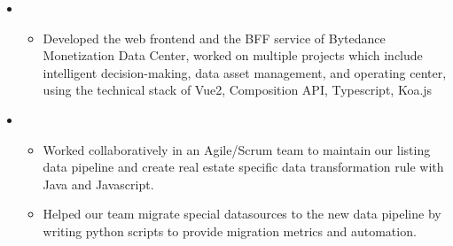 \documentclass[11pt,a4paper,sans]{moderncv}        %
\begin{document}
\begin{itemize}
\vspace{2pt}

\item{

\begin{itemize}
\item{Developed the web frontend and the BFF service of Bytedance Monetization Data Center, worked on multiple projects which include intelligent decision-making, data asset management, and operating center, using the technical stack of Vue2, Composition API, Typescript, Koa.js}

\end{itemize}}

\vspace{1em}

\item{

\begin{itemize}
\item{Worked collaboratively in an Agile/Scrum team to maintain our listing data pipeline and create real estate specific data transformation rule with Java and Javascript.}
\vspace{2pt}
\item{Helped our team migrate special datasources to the new data pipeline by writing python scripts to provide migration metrics and automation.}

\end{itemize}}

\end{itemize}
\end{document}
